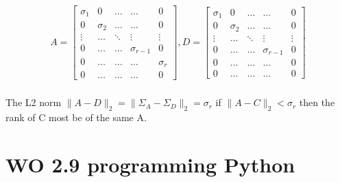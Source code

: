 \documentclass[a4paper]{article}
\begin{document}
\begin{equation}
	\begin{aligned}
		A = \begin{bmatrix} \sigma_1& 0& \ldots & \ldots& 0\\ 
			0& \sigma_2& \ldots& \ldots& 0\\
			\vdots& \ldots&  \ddots& \vdots& \vdots \\
			0& \ldots& \ldots& \sigma_{r-1}& 0 \\
			0& \ldots& \ldots& \ldots& \sigma_r \\
		0& \ldots& \ldots& \ldots& 0\end{bmatrix},
		D = \begin{bmatrix} \sigma_1& 0& \ldots & \ldots& 0\\ 
			0& \sigma_2& \ldots& \ldots& 0\\
			\vdots& \ldots&  \ddots& \vdots& \vdots \\
			0& \ldots& \ldots& \sigma_{r-1}&  0 \\
			0& \ldots& \ldots& \ldots& 0 \\
		0& \ldots& \ldots& \ldots& 0\end{bmatrix} \\ 
	\end{aligned}
\end{equation}

The L2 norm $\|A-D\|_2 = \|\Sigma_A -\Sigma_D\|_2 = \sigma_r $ if $\|A-C\|_2 < \sigma_r$ then the rank of C most be of the same A.  

\section{WO 2.9 programming  Python}
\end{document}
